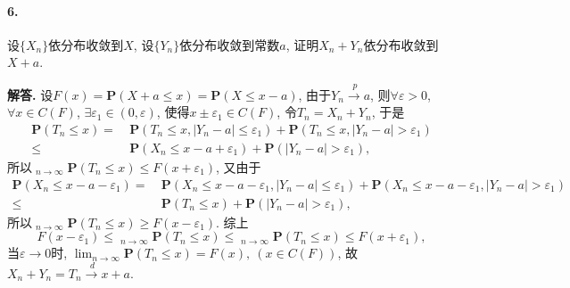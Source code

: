 \documentclass[12pt, a4paper, oneside]{ctexart}
\newenvironment{solution}{\par\noindent\textbf{解答. }}{\bigskip\par}
\DeclareMathOperator*\uplim{\overline{lim}} %
\DeclareMathOperator*\lowlim{\underline{lim}} %
\let\leq=\leqslant %
\let\geq=\geqslant %
\def\pra{\xrightarrow{\ \ p\ }}     %
\def\dra{\xrightarrow{\ \ d\ }}     %
\def\P{\textbf{P}}      %
\begin{document}
\paragraph*{6.}设$\{X_n\}$依分布收敛到$X$, 设$\{Y_n\}$依分布收敛到常数$a$, 证明$X_n+Y_n$依分布收敛到$X+a$.
\begin{solution}
    设$F(x) = \P(X+a\leq x) = \P(X\leq x - a)$, 由于$Y_n\pra a$, 则$\forall \varepsilon > 0$, $\forall x\in C(F)$, $\exists\varepsilon_1\in(0,\varepsilon)$, 使得$x\pm \varepsilon_1\in C(F)$, 令$T_n=X_n+Y_n$, 于是
    \begin{align*}
        \P(T_n\leq x) =&\ \P(T_n\leq x,|Y_n-a|\leq \varepsilon_1)+\P(T_n\leq x,|Y_n-a|>\varepsilon_1)\\
        \leq&\ \P(X_n\leq x-a+\varepsilon_1)+\P(|Y_n-a| > \varepsilon_1),
    \end{align*}
    所以$\uplim_{n\to\infty}\P(T_n\leq x) \leq F(x+\varepsilon_1)$, 又由于
    \begin{align*}
        \P(X_n\leq x-a-\varepsilon_1) =&\ \P(X_n\leq x-a-\varepsilon_1,|Y_n-a|\leq\varepsilon_1)+\P(X_n\leq x-a-\varepsilon_1,|Y_n-a| > \varepsilon_1)\\
        \leq&\ \P(T_n\leq x)+\P(|Y_n-a| > \varepsilon_1),
    \end{align*}
    所以$\lowlim_{n\to\infty}\P(T_n\leq x)\geq F(x-\varepsilon_1)$. 综上
    \begin{equation*}
        F(x-\varepsilon_1)\leq \lowlim_{n\to\infty}\P(T_n\leq x)\leq \uplim_{n\to\infty}\P(T_n\leq x)\leq F(x+\varepsilon_1),
    \end{equation*}
    当$\varepsilon\to0$时, $\lim_{n\to\infty}\P(T_n\leq x) = F(x),\ (x\in C(F))$, 故$X_n+Y_n=T_n\dra x+a$.
\end{solution}
\end{document}
